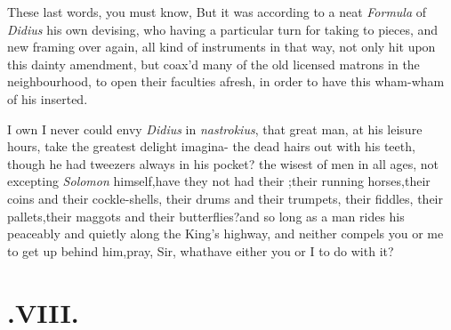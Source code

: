 \documentclass{article}
\begin{document}
These last words, you must know,\break
{} 
 But
it was according to a neat \textit{Formula} of \textit{Didius} his own devising, who
having 
a particular turn for taking to pieces,\break
and new framing over again, all kind of\break
instruments in that way, not only hit\break
upon this dainty amendment, but coax’d\break
many of the old licensed matrons in the\break
neighbourhood, to open their faculties\break
afresh, in order to have this wham-wham\break
of his inserted.

I own I never could envy \textit{Didius} in
\textit{nastrokius}, that great man, at his leisure hours, take the
greatest delight imagina-
the dead hairs out with his teeth, though he had tweezers always in
his pocket?
 the wisest of
men in all ages, not excepting \textit{Solomon} himself,\tsk have
they not had their
;\tsk their running
horses,\tsk their coins and their cockle-shells, their drums and
their trumpets, their fiddles, their pallets,\tsk their maggots
and their butterflies?\tsk and so long as a man rides his
 peaceably and quietly
along the King’s highway, and neither compels you or me to
get up behind him,\tsh pray, Sir, what\break have either you or I to do
with it?

\null
\section{.\enspace VIII.}
\end{document}
